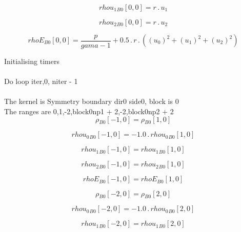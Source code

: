 \documentclass{article}
\begin{document}
\begin{dmath}{rhou_{1}{_{B0}}}[{0,0}] = r \,.\, u_{1}\end{dmath}

\begin{dmath}{rhou_{2}{_{B0}}}[{0,0}] = r \,.\, u_{2}\end{dmath}

\begin{dmath}{rhoE{_{B0}}}[{0,0}] = \frac{p}{gama - 1} + 0.5 \,.\, r \,.\, \left(\left(u_{0} \right)^{2} + \left(u_{1} \right)^{2} + \left(u_{2} \right)^{2}\right)\end{dmath}

\noindent Initialising timers\\
\\\noindent Do loop iter,0, niter - 1\\
\\\noindent The kernel is Symmetry boundary dir0 side0, block is 0\\\noindent The ranges are 0,1,-2,block0np1 + 2,-2,block0np2 + 2\\\begin{dmath}{\rho{_{B0}}}[{-1,0}] = {\rho{_{B0}}}[{1,0}]\end{dmath}

\begin{dmath}{rhou_{0}{_{B0}}}[{-1,0}] = - 1.0 \,.\, {rhou_{0}{_{B0}}}[{1,0}]\end{dmath}

\begin{dmath}{rhou_{1}{_{B0}}}[{-1,0}] = {rhou_{1}{_{B0}}}[{1,0}]\end{dmath}

\begin{dmath}{rhou_{2}{_{B0}}}[{-1,0}] = {rhou_{2}{_{B0}}}[{1,0}]\end{dmath}

\begin{dmath}{rhoE{_{B0}}}[{-1,0}] = {rhoE{_{B0}}}[{1,0}]\end{dmath}

\begin{dmath}{\rho{_{B0}}}[{-2,0}] = {\rho{_{B0}}}[{2,0}]\end{dmath}

\begin{dmath}{rhou_{0}{_{B0}}}[{-2,0}] = - 1.0 \,.\, {rhou_{0}{_{B0}}}[{2,0}]\end{dmath}

\begin{dmath}{rhou_{1}{_{B0}}}[{-2,0}] = {rhou_{1}{_{B0}}}[{2,0}]\end{dmath}
\end{document}
